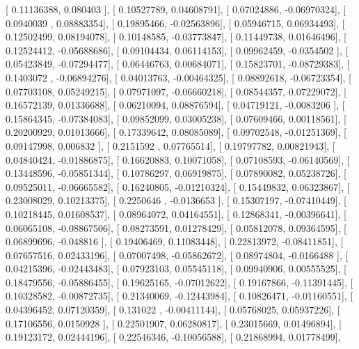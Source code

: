 \documentclass{article}
\begin{document}
       [ 0.11136388,  0.080403  ],
       [ 0.10527789,  0.04608791],
       [ 0.07024886, -0.06970324],
       [ 0.0940039 ,  0.08883354],
       [ 0.19895466, -0.02563896],
       [ 0.05946715,  0.06934493],
       [ 0.12502499,  0.08194078],
       [ 0.10148585, -0.03773847],
       [ 0.11449738,  0.01646496],
       [ 0.12524412, -0.05688686],
       [ 0.09104434,  0.06114153],
       [ 0.09962459, -0.0354502 ],
       [ 0.05423849, -0.07294477],
       [ 0.06446763,  0.00684071],
       [ 0.15823701, -0.08729383],
       [ 0.1403072 , -0.06894276],
       [ 0.04013763, -0.00464325],
       [ 0.08892618, -0.06723354],
       [ 0.07703108,  0.05249215],
       [ 0.07971097, -0.06660218],
       [ 0.08544357,  0.07229072],
       [ 0.16572139,  0.01336688],
       [ 0.06210094,  0.08876594],
       [ 0.04719121, -0.0083206 ],
       [ 0.15864345, -0.07384083],
       [ 0.09852099,  0.03005238],
       [ 0.07609466,  0.00118561],
       [ 0.20200929,  0.01013666],
       [ 0.17339642,  0.08085089],
       [ 0.09702548, -0.01251369],
       [ 0.09147998,  0.006832  ],
       [ 0.2151592 ,  0.07765514],
       [ 0.19797782,  0.00821943],
       [ 0.04840424, -0.01886875],
       [ 0.16620883,  0.10071058],
       [ 0.07108593, -0.06140569],
       [ 0.13448596, -0.05851344],
       [ 0.10786297,  0.06919875],
       [ 0.07890082,  0.05238726],
       [ 0.09525011, -0.06665582],
       [ 0.16240805, -0.01210324],
       [ 0.15449832,  0.06323867],
       [ 0.23008029,  0.10213375],
       [ 0.2250646 , -0.0136653 ],
       [ 0.15307197, -0.07410449],
       [ 0.10218445,  0.01608537],
       [ 0.08964072,  0.04164551],
       [ 0.12868341, -0.00396641],
       [ 0.06065108, -0.08867506],
       [ 0.08273591,  0.01278429],
       [ 0.05812078,  0.09364595],
       [ 0.06899696, -0.048816  ],
       [ 0.19406469,  0.11083448],
       [ 0.22813972, -0.08411851],
       [ 0.07657516,  0.02433196],
       [ 0.07007498, -0.05862672],
       [ 0.08974804, -0.0166488 ],
       [ 0.04215396, -0.02443483],
       [ 0.07923103,  0.05545118],
       [ 0.09940906,  0.00555525],
       [ 0.18479556, -0.05886455],
       [ 0.19625165, -0.07012622],
       [ 0.19167866, -0.11391445],
       [ 0.10328582, -0.00872735],
       [ 0.21340069, -0.12443984],
       [ 0.10826471, -0.01160551],
       [ 0.04396452,  0.07120359],
       [ 0.131022  , -0.00411144],
       [ 0.05768025,  0.05937226],
       [ 0.17106556,  0.0150928 ],
       [ 0.22501907,  0.06280817],
       [ 0.23015669,  0.01496894],
       [ 0.19123172,  0.02444196],
       [ 0.22546346, -0.10056588],
       [ 0.21868994,  0.01778499],
\end{document}
